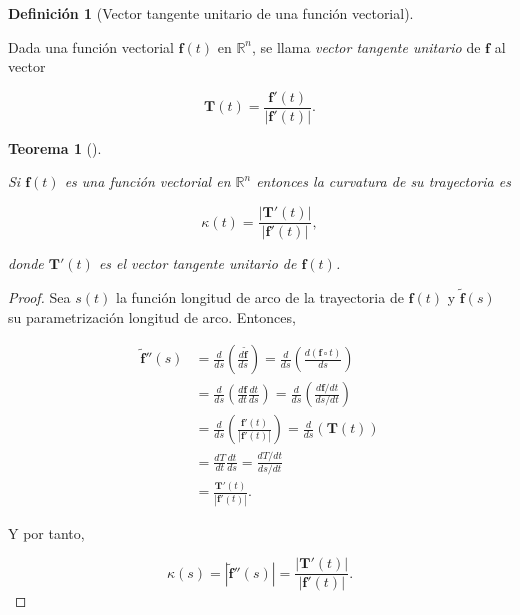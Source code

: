 \documentclass[
  a4paper,
]{scrreport}
\theoremstyle{definition}
\theoremstyle{plain}
\theoremstyle{definition}
\newtheorem{definition}{Definición}[chapter]
\theoremstyle{definition}
\theoremstyle{plain}
\newtheorem{theorem}{Teorema}[chapter]
\theoremstyle{plain}
\theoremstyle{remark}
\begin{document}
\begin{definition}[Vector tangente unitario de una función
vectorial]\protect\hypertarget{def-vector-tangente-unitario}{}\label{def-vector-tangente-unitario}

Dada una función vectorial \(\mathbf{f}(t)\) en \(\mathbb{R}^n\), se
llama \emph{vector tangente unitario} de \(\mathbf{f}\) al vector

\[
\mathbf{T}(t) = \frac{\mathbf{f}'(t)}{|\mathbf{f}'(t)|}.
\]

\end{definition}

\begin{theorem}[]\protect\hypertarget{thm-curvatura-trayectoria}{}\label{thm-curvatura-trayectoria}

Si \(\mathbf{f}(t)\) es una función vectorial en \(\mathbb{R}^n\)
entonces la curvatura de su trayectoria es

\[
\kappa(t) = \frac{|\mathbf{T}'(t)|}{|\mathbf{f}'(t)|},
\]

donde \(\mathbf{T}'(t)\) es el vector tangente unitario de
\(\mathbf{f}(t)\).

\end{theorem}

\begin{tcolorbox}[enhanced jigsaw, leftrule=.75mm, colbacktitle=quarto-callout-note-color!10!white, toprule=.15mm, opacityback=0, opacitybacktitle=0.6, toptitle=1mm, breakable, bottomtitle=1mm, colframe=quarto-callout-note-color-frame, rightrule=.15mm, titlerule=0mm, title=\textcolor{quarto-callout-note-color}{\faInfo}\hspace{0.5em}{Demostración}, arc=.35mm, left=2mm, bottomrule=.15mm, colback=white, coltitle=black]

\begin{proof}
Sea \(s(t)\) la función longitud de arco de la trayectoria de
\(\mathbf{f}(t)\) y \(\tilde{\mathbf{f}}(s)\) su parametrización
longitud de arco. Entonces,

\begin{align*}
\tilde{\mathbf{f}}''(s) 
&= \frac{d}{ds}\left(\frac{d\tilde{\mathbf{f}}}{ds}\right)
= \frac{d}{ds}\left(\frac{d(\mathbf{f}\circ t)}{ds}\right) \\
&= \frac{d}{ds}\left(\frac{d\mathbf{f}}{dt}\frac{dt}{ds}\right)
= \frac{d}{ds}\left(\frac{d\mathbf{f}/dt}{ds/dt}\right) \tag{Regla cadena} \\
&= \frac{d}{ds}\left(\frac{\mathbf{f}'(t)}{|\mathbf{f}'(t)|}\right)
= \frac{d}{ds}(\mathbf{T}(t)) \\
&= \frac{dT}{dt}\frac{dt}{ds} 
= \frac{dT/dt}{ds/dt} \tag{Regla cadena} \\
&= \frac{\mathbf{T}'(t)}{|\mathbf{f}'(t)|}.
\end{align*}

Y por tanto,

\[
\kappa(s) 
= |\tilde{\mathbf{f}}''(s)| 
= \frac{|\mathbf{T}'(t)|}{|\mathbf{f}'(t)|}.
\]
\end{proof}

\end{tcolorbox}
\end{document}
